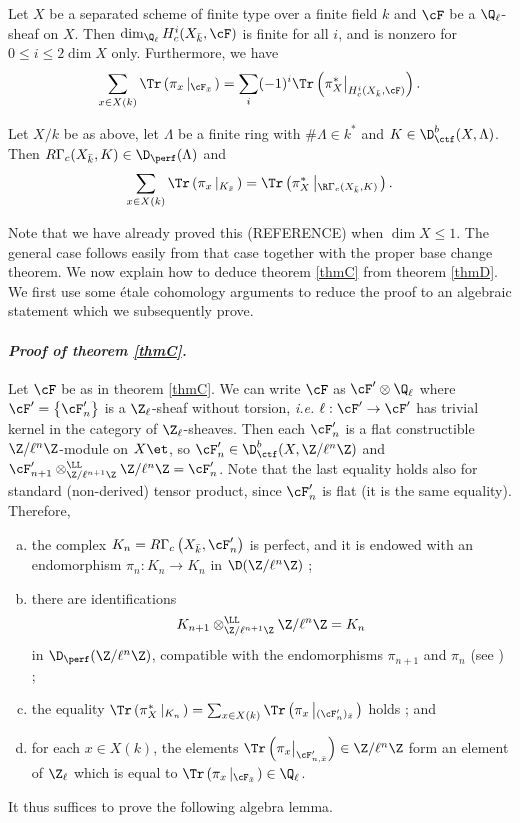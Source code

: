 
\begin{thm} \label{thmC}
Let $X$ be a separated scheme of finite type over a finite field $k$ and $\cF$ be a $\Q_\ell$-sheaf on $X$. Then $\dim_{\Q_\ell}H_c^i(X_{\bar k}, \cF)$ is finite for all $i$, and is nonzero for $0\leqslant i \leqslant 2 \dim X$ only. Furthermore, we have
$$
\sum_{x\in X(k)} \Tr\left(\pi_x\left|_{\cF_{\bar x}}\right.\right) = \sum_i (-1)^i\Tr\left(\pi_X^*\big|_{H_c^i(X_{\bar k}, \cF)}\right).
$$
\end{thm}

\begin{thm} \label{thmD} 
Let $X/k$ be as above, let $\Lambda$ be a finite ring with $\#\Lambda \in k^*$ and $K\in \D_{\ctf}^b(X, \Lambda)$. Then $R\Gamma_c(X_{\bar k}, K)\in \D_{\perf}(\Lambda)$ and
$$
\sum_{x\in X(k)}\Tr\left(\pi_x\left|_{K_{\bar x}}\right.\right) = \Tr\left(\pi_X^*\left|_{\R\Gamma_c(X_{\bar k}, K )}\right.\right).
$$
\end{thm}

Note that we have already proved this (REFERENCE) when $\dim X \leqslant 1$. The general case follows easily from that case together with the proper base change theorem. We now explain how to deduce theorem \ref{thmC} from theorem \ref{thmD}. We first use some \'etale cohomology arguments to reduce the proof to an algebraic statement which we subsequently prove.

\paragraph{\it Proof of theorem \ref{thmC}.}
Let $\cF$ be as in theorem \ref{thmC}. We can write $\cF$ as $\cF'\otimes \Q_\ell$ where $\cF' = \left\{\cF'_n\right\}$ is a $\Z_\ell$-sheaf without torsion, {\it i.e.} $\ell : \cF'\to \cF'$ has trivial kernel in the category of $\Z_\ell$-sheaves. Then each $\cF_n'$ is a flat constructible $\Z/\ell^n\Z$-module on $X\et$, so $\cF'_n \in \D_{\ctf}^b(X, \Z/\ell^n\Z)$ and $\cF_{n+1}'\otimes^{\LL}_{\Z/\ell^{n+1}\Z}\Z/\ell^n\Z=\cF_n'$. Note that the last equality holds also for standard (non-derived) tensor product, since $\cF'_n$ is flat (it is the same equality). Therefore,
\begin{enumerate}[(a)]
\item
the complex $K_n= R\Gamma_c\left(X_{\bar k}, \cF_n'\right)$ is perfect, and it is endowed with an endomorphism $\pi_n: K_n\to K_n$ in $\D(\Z/\ell^n\Z)$ ; 
\item 
there are identifications 
$$
K_{n+1}\otimes^{\LL}_{\Z/\ell^{n+1}\Z}\Z/\ell^n\Z = K_n
$$ 
in $\D_{\perf}(\Z/\ell^n\Z)$, compatible with the endomorphisms  $\pi_{n+1}$ and $\pi_n$ (see \cite[Rapport 4.12]{SGA4.5}) ;
\item 
the equality $\Tr\left(\pi_X^*\left|_{K_n}\right.\right) = \sum_{x\in X(k)}\Tr\left(\pi_x\left|_{(\cF'_n)_{\bar x}}\right.\right)$ holds ; and
\item 
for each $x\in X(k)$, the elements $\Tr\left(\pi_x\big|_{\cF'_{n, \bar x}}\right)\in \Z/\ell^n\Z$ form an element of $\Z_\ell$ which is equal to $\Tr\left(\pi_x\left|_{\cF_{\bar x}}\right.\right)\in \Q_\ell$.
\end{enumerate}
It thus suffices to prove the following algebra lemma.

